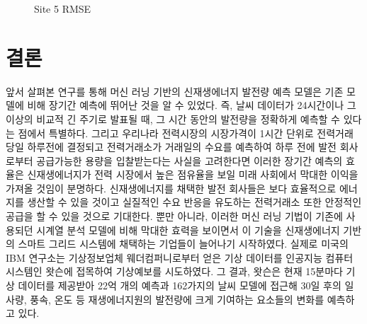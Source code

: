 \documentclass{article}
\begin{document}
\begin{figure}[!h]
\centering
{}
\caption{Site 5 RMSE}
\label{fig_6}
\end{figure}



\section{결론}
앞서 살펴본 연구를 통해 머신 러닝 기반의 신재생에너지 발전량 예측 모델은 기존 모델에 비해 장기간 예측에 뛰어난 것을 알 수 있었다. 즉, 날씨 데이터가 24시간이나 그 이상의 비교적 긴 주기로 발표될 때, 그 시간 동안의 발전량을 정확하게 예측할 수 있다는 점에서 특별하다. 그리고 우리나라 전력시장의 시장가격이 1시간 단위로 전력거래 당일 하루전에 결정되고 전력거래소가 거래일의 수요를 예측하여 하루 전에 발전 회사로부터 공급가능한 용량을 입찰받는다는 사실을 고려한다면 이러한 장기간 예측의 효율은 신재생에너지가 전력 시장에서 높은 점유율을 보일 미래 사회에서 막대한 이익을 가져올 것임이 분명하다. 신재생에너지를 채택한 발전 회사들은 보다 효율적으로 에너지를 생산할 수 있을 것이고 실질적인 수요 반응을 유도하는 전력거래소 또한 안정적인 공급을 할 수 있을 것으로 기대한다. \newline
뿐만 아니라, 이러한 머신 러닝 기법이 기존에 사용되던 시계열 분석 모델에 비해 막대한 효력을 보이면서 이 기술을 신재생에너지 기반의 스마트 그리드 시스템에 채택하는 기업들이 늘어나기 시작하였다. 실제로 미국의 IBM 연구소는 기상정보업체 웨더컴퍼니로부터 얻은 기상 데이터를 인공지능 컴퓨터 시스템인 왓슨에 접목하여 기상예보를 시도하였다. 그 결과, 왓슨은 현재 15분마다 기상 데이터를 제공받아 22억 개의 예측과 162가지의 날씨 모델에 접근해 30일 후의 일사량, 풍속, 온도 등 재생에너지원의 발전량에 크게 기여하는 요소들의 변화를 예측하고 있다.
\end{document}
